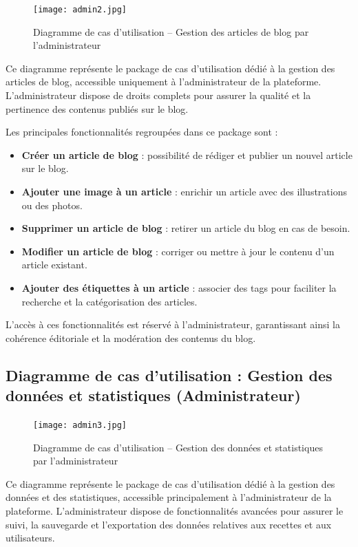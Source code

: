\documentclass[12pt,a4paper]{report}
\begin{document}
\begin{figure}[H]
    \centering
    \texttt{[image: admin2.jpg]}
    \caption{Diagramme de cas d’utilisation – Gestion des articles de blog par l’administrateur}
    \label{fig:usecase_admin_blog}
\end{figure}

Ce diagramme représente le package de cas d’utilisation dédié à la gestion des articles de blog, accessible uniquement à l’administrateur de la plateforme. L’administrateur dispose de droits complets pour assurer la qualité et la pertinence des contenus publiés sur le blog.

Les principales fonctionnalités regroupées dans ce package sont :
\begin{itemize}
    \item \textbf{Créer un article de blog} : possibilité de rédiger et publier un nouvel article sur le blog.
    \item \textbf{Ajouter une image à un article} : enrichir un article avec des illustrations ou des photos.
    \item \textbf{Supprimer un article de blog} : retirer un article du blog en cas de besoin.
    \item \textbf{Modifier un article de blog} : corriger ou mettre à jour le contenu d’un article existant.
    \item \textbf{Ajouter des étiquettes à un article} : associer des tags pour faciliter la recherche et la catégorisation des articles.
\end{itemize}

L’accès à ces fonctionnalités est réservé à l’administrateur, garantissant ainsi la cohérence éditoriale et la modération des contenus du blog.
\subsection{Diagramme de cas d’utilisation : Gestion des données et statistiques (Administrateur)}

\begin{figure}[H]
    \centering
    \texttt{[image: admin3.jpg]}
    \caption{Diagramme de cas d’utilisation – Gestion des données et statistiques par l’administrateur}
    \label{fig:usecase_admin_stats}
\end{figure}

Ce diagramme représente le package de cas d’utilisation dédié à la gestion des données et des statistiques, accessible principalement à l’administrateur de la plateforme. L’administrateur dispose de fonctionnalités avancées pour assurer le suivi, la sauvegarde et l’exportation des données relatives aux recettes et aux utilisateurs.
\end{document}
